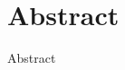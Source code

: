 
\chapter*{Abstract}

\begin{DoubleSpace}
    \linespread{2.0}\selectfont{}

    Abstract


\end{DoubleSpace}
